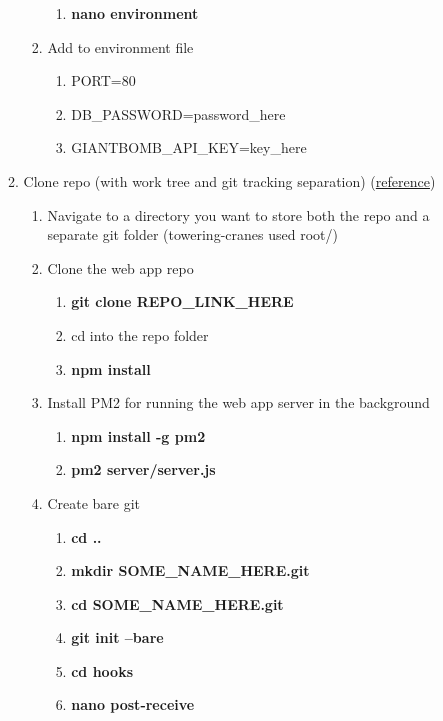 \documentclass{article}
\begin{document}
\begin{flushleft}
\begin{enumerate}
\begin{enumerate}
\begin{enumerate}
\begin{enumerate}
        \item \textbf{nano environment}
      \end{enumerate}
      \item Add to environment file
      \begin{enumerate}
        \item PORT=80
        \item DB\_PASSWORD=password\_here
        \item GIANTBOMB\_API\_KEY=key\_here
      \end{enumerate}
    \end{enumerate}
    \item Clone repo (with work tree and git tracking separation) (\href{https://www.digitalocean.com/community/tutorials/how-to-set-up-automatic-deployment-with-git-with-a-vps}{reference})
    \begin{enumerate}
      \item Navigate to a directory you want to store both the repo and a separate git folder (towering-cranes used root/)
      \item Clone the web app repo
      \begin{enumerate}
        \item \textbf{git clone REPO\_LINK\_HERE}
        \item cd into the repo folder
        \item \textbf{npm install}
      \end{enumerate}
      \item Install PM2 for running the web app server in the background
      \begin{enumerate}
        \item \textbf{npm install -g pm2}
        \item \textbf{pm2 server/server.js}
      \end{enumerate}
      \item Create bare git
      \begin{enumerate}
        \item \textbf{cd ..}
        \item \textbf{mkdir SOME\_NAME\_HERE.git}
        \item \textbf{cd SOME\_NAME\_HERE.git}
        \item \textbf{git init --bare}
        \item \textbf{cd hooks}
        \item \textbf{nano post-receive}
      \end{enumerate}

\end{enumerate}
\end{enumerate}
\end{enumerate}
\end{flushleft}
\end{document}
